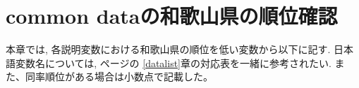 








\chapter{common dataの和歌山県の順位確認}

本章では, 各説明変数における和歌山県の順位を低い変数から以下に記す.
日本語変数名については,
\pageref{datalist}ページの
\ref{datalist}章の対応表を一緒に参考されたい.
また、同率順位がある場合は小数点で記載した。


\begin{multicols}{2}


\end{multicols}
